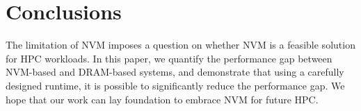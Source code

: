 \section{Conclusions}
\begin{spacing}{0.9}
The limitation of NVM imposes a question on 
whether NVM is a feasible solution for HPC workloads. 
In this paper, we quantify the performance gap 
between NVM-based and DRAM-based systems, and demonstrate that
using a carefully designed runtime, it is possible
to significantly reduce the performance gap. 
We hope that our work can lay foundation to embrace NVM for future HPC.
\end{spacing}